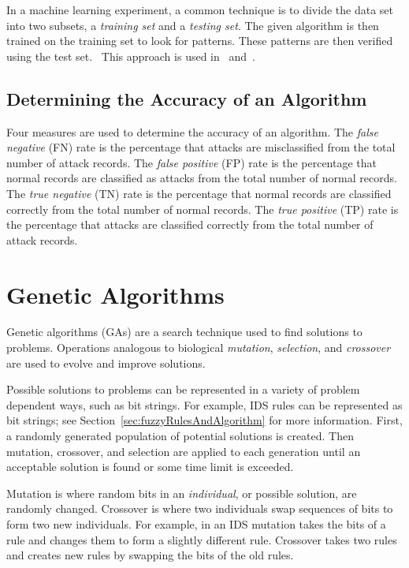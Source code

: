 \documentclass{sig-alternate}
\begin{document}
In a machine learning experiment, a common technique is to divide the data set into two subsets, a \emph{training set} and a \emph{testing set}. The given algorithm is then trained on the training set to look for patterns. These patterns are then verified using the test set.~\cite{bc1_ecindm} This approach is used in~\cite{6496342, 6559603} and~\cite{DBLP:journals/corr/abs-1204-1336}.



\subsection{Determining the Accuracy of an Algorithm}
\label{sec:PosNeg}
Four measures are used to determine the accuracy of an algorithm. The \emph{false negative} (FN) rate is the percentage that attacks are misclassified from the total number of attack records. The \emph{false positive} (FP) rate is the percentage that normal records are classified as attacks from the total number of normal records. The \emph{true negative} (TN) rate is the percentage that normal records are classified correctly from the total number of normal records. The \emph{true positive} (TP) rate is the percentage that attacks are classified correctly from the total number of attack records.~\cite{6496342, bc1_ecindm}



\section{Genetic Algorithms}
\label{sec:GA}
Genetic algorithms (GAs) are a search technique used to find solutions to problems. Operations analogous to biological \emph{mutation}, \emph{selection}, and \emph{crossover} are used to evolve and improve solutions.

Possible solutions to problems can be represented in a variety of problem dependent ways, such as bit strings. For example, IDS rules can be represented as bit strings; see Section~\ref{sec:fuzzyRulesAndAlgorithm} for more information. First, a randomly generated population of potential solutions is created. Then mutation, crossover, and selection are applied to each generation until an acceptable solution is found or some time limit is exceeded.

Mutation is where random bits in an \emph{individual}, or possible solution, are randomly changed. Crossover is where two individuals swap sequences of bits to form two new individuals. For example, in an IDS mutation takes the bits of a rule and changes them to form a slightly different rule. Crossover takes two rules and creates new rules by swapping the bits of the old rules.
\end{document}
